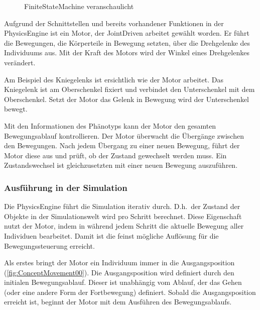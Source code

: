       \begin{figure}[H]
        \centering
        
        \caption{\Gls{FiniteStateMachine} veranschaulicht\label{fig:ConceptEngineFSM}}
      \end{figure}

      Aufgrund der Schnittstellen und bereits vorhandener Funktionen in der \gls{PhysicsEngine} ist ein Motor,
      der \gls{JointDriven} arbeitet gewählt worden.
      Er führt die Bewegungen, die Körperteile in Bewegung setzten, über die Drehgelenke des Individuums aus.
      Mit der Kraft des Motors wird der Winkel eines Drehgelenkes verändert.

      \medskip

      Am Beispiel des Kniegelenks ist ersichtlich wie der Motor arbeitet.
      Das Kniegelenk ist am Oberschenkel fixiert und verbindet den Unterschenkel mit dem Oberschenkel.
      Setzt der Motor das Gelenk in Bewegung wird der Unterschenkel bewegt.

      \medskip

      Mit den Informationen des Phänotyps kann der Motor den gesamten Bewegungsablauf kontrollieren.
      Der Motor überwacht die Übergänge zwischen den Bewegungen.
      Nach jedem Übergang zu einer neuen Bewegung, führt der Motor diese aus und prüft,
      ob der Zustand gewechselt werden muss.
      Ein Zustandswechsel ist gleichzusetzten mit einer neuen Bewegung auszuführen.

      \subsubsection{Ausführung in der Simulation}

        Die \gls{PhysicsEngine} führt die Simulation iterativ durch.
        D.h.\ der Zustand der Objekte in der Simulationswelt wird pro Schritt berechnet.
        Diese Eigenschaft nutzt der Motor,
        indem in während jedem Schritt die aktuelle Bewegung aller Individuen bearbeitet.
        Damit ist die feinst mögliche Auflösung für die Bewegungssteuerung erreicht.

        \medskip

        Als erstes bringt der Motor ein Individuum immer in die Ausgangsposition (\vref{fig:ConceptMovement00}).
        Die Ausgangsposition wird definiert durch den initialen Bewegungsablauf.
        Dieser ist unabhängig vom Ablauf, der das Gehen (oder eine andere Form der Fortbewegung) definiert.
        Sobald die Ausgangsposition erreicht ist, beginnt der Motor mit dem Ausführen des Bewegungsablaufs.

